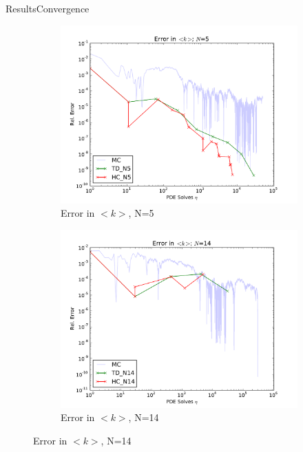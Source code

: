 \documentclass{beamer}
\begin{document}
\begin{frame}{Results}{Convergence}
  \begin{figure}[h!]
    \centering
    \begin{subfigure}[b]{0.49 \textwidth}
      \includegraphics[width=\textwidth]{../graphics/err_5}
      \caption{Error in $<k>$, N=5}
      \label{err_5}
    \end{subfigure}
    \begin{subfigure}[b]{0.49 \textwidth}
      \includegraphics[width=\textwidth]{../graphics/err_14}
      \caption{Error in $<k>$, N=14}
      \label{err_14}
    \end{subfigure}
  \end{figure}
\end{frame}
\end{document}
